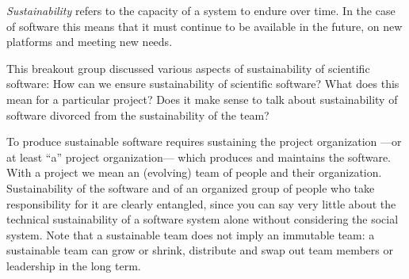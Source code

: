 \documentclass[a4paper,UKenglish]{dagrep}
\begin{document}
%

\emph{Sustainability} refers to the capacity of a system to endure over time. In the case of software this means that it must continue to be available in the future, on new platforms and meeting new needs.

This breakout group discussed various aspects of sustainability of scientific software:
How can we ensure sustainability of scientific software? What does this mean for a particular project? Does it make sense to talk about sustainability of software divorced from the sustainability of the team?

To produce sustainable software requires sustaining the project organization ---or at least ``a'' project organization--- which produces and maintains the software. With a project we mean an (evolving) team of people and their organization.
Sustainability of the software and of an organized group of people who take responsibility for it are clearly entangled, since you can say very little about the technical sustainability of a software system alone without considering the social system. Note that a sustainable team does not imply an immutable team: a sustainable team can grow or shrink, distribute and swap out team members or leadership in the long term.
\end{document}
